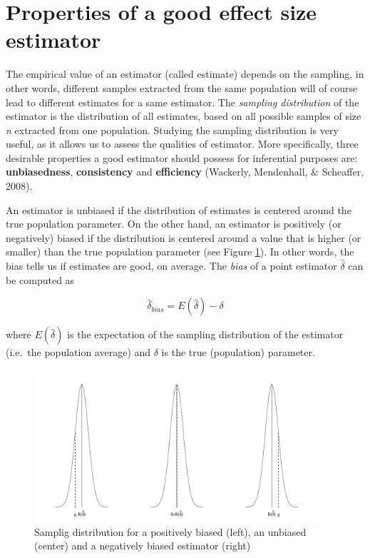 \documentclass[
  man,floatsintext]{apa6}
\begin{document}
\hypertarget{properties-of-a-good-effect-size-estimator}{%
\section{Properties of a good effect size estimator}\label{properties-of-a-good-effect-size-estimator}}

The empirical value of an estimator (called estimate) depends on the sampling, in other words, different samples extracted from the same population will of course lead to different estimates for a same estimator. The \emph{sampling distribution} of the estimator is the distribution of all estimates, based on all possible samples of size \emph{n} extracted from one population. Studying the sampling distribution is very useful, as it allows us to assess the qualities of estimator. More specifically, three desirable properties a good estimator should possess for inferential purposes are: \textbf{unbiasedness}, \textbf{consistency} and \textbf{efficiency} (Wackerly, Mendenhall, \& Scheaffer, 2008).

An estimator is unbiased if the distribution of estimates is centered around the true population parameter. On the other hand, an estimator is positively (or negatively) biased if the distribution is centered around a value that is higher (or smaller) than the true population parameter (see Figure \ref{fig:BIAS}). In other words, the bias tells us if estimates are good, on average. The \emph{bias} of a point estimator \(\hat{\delta}\) can be computed as

\begin{equation} 
\hat{\delta}_{bias}=E(\hat{\delta})-\delta
\label{eq:BIAS}
\end{equation}

where \(E(\hat{\delta})\) is the expectation of the sampling distribution of the estimator (i.e.~the population average) and \(\delta\) is the true (population) parameter.

\begin{figure}
\includegraphics[width=400px]{ES_files/figure-latex/BIAS-1} \caption{Samplig distribution for a positively biased (left), an unbiased (center) and a negatively biased estimator (right)}\label{fig:BIAS}
\end{figure}
\end{document}
